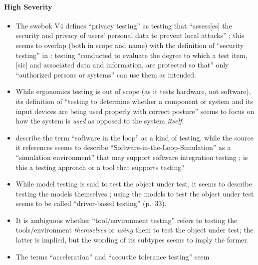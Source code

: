 \ifnotpaper\paragraph{High Severity}\fi
\begin{itemize}
      \item The \acs{swebok} V4 defines ``privacy testing'' as testing that
            ``assess[es] the security and privacy of users' personal data to
            prevent local attacks'' \citep[p.~5-10]{SWEBOK2024}; this seems to
            overlap (both in scope and name) with
            the definition of ``security testing'' in \citep{IEEE2022}: testing
            ``conducted to evaluate the degree to which a test item, [sic] and
            associated data and information, are protected so that'' only
            ``authorized persons or systems'' can use them as intended.
            \ifnotpaper
      \item While ergonomics testing is out of scope (as it tests hardware, not
            software), its definition of ``testing to determine whether a
            component or system and its input devices are being used properly
            with correct posture'' \citepISTQB{} seems to focus on how the
            system is \emph{used} as opposed to the system \emph{itself}.
      \item \citetISTQB{} describe the term ``software in the loop'' as a
            kind of testing, while the source it references seems to describe
            ``Software-in-the-Loop-Simulation'' as a ``simulation environment''
            that may support software integration testing
            \citep[p.~153]{SPICE2022}; is this a testing approach or a tool
            that supports testing?
      \item While model testing is said to test the object under test,
            it seems to describe testing the models themselves
            \citet[p.~20]{Firesmith2015}; using the models to test the object
            under test seems to be called ``driver-based testing'' (p.~33).\fi
      \item It is ambiguous whether ``tool/environment testing'' refers to
            testing the tools/environment \emph{themselves} or \emph{using}
            them to test the object under test; the latter is implied, but the
            wording of its subtypes \citep[p.~25]{Firesmith2015} seems to imply
            the former.
            \ifnotpaper
      \item The terms ``acceleration'' and ``acoustic tolerance testing'' seem

\end{itemize}

